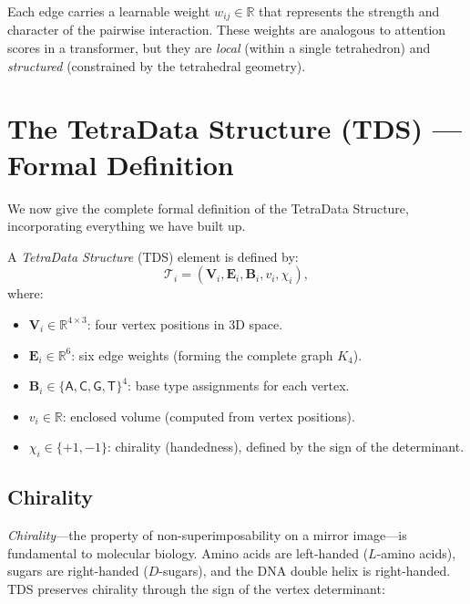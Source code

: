 Each edge carries a learnable weight $w_{ij} \in \mathbb{R}$ that represents
the strength and character of the pairwise interaction. These weights are
analogous to attention scores in a transformer, but they are \emph{local}
(within a single tetrahedron) and \emph{structured} (constrained by the
tetrahedral geometry).

\section{The TetraData Structure (TDS) --- Formal Definition}
\label{sec:tds}

We now give the complete formal definition of the TetraData Structure,
incorporating everything we have built up.

\begin{definition}
\label{def:tds}
A \emph{TetraData Structure} (TDS) element is defined by:
\begin{equation}
\mathcal{T}_i = (\mathbf{V}_i, \mathbf{E}_i, \mathbf{B}_i, v_i, \chi_i),
\end{equation}
where:
\begin{itemize}[leftmargin=1.5em]
  \item $\mathbf{V}_i \in \mathbb{R}^{4 \times 3}$: four vertex positions in 3D space.
  \item $\mathbf{E}_i \in \mathbb{R}^{6}$: six edge weights (forming the complete graph $K_4$).
  \item $\mathbf{B}_i \in \{\mathsf{A}, \mathsf{C}, \mathsf{G}, \mathsf{T}\}^4$: base type assignments for each vertex.
  \item $v_i \in \mathbb{R}$: enclosed volume (computed from vertex positions).
  \item $\chi_i \in \{+1, -1\}$: chirality (handedness), defined by the sign of the determinant.
\end{itemize}
\end{definition}

\subsection{Chirality}
\label{sec:chirality}

\emph{Chirality}---the property of non-superimposability on a mirror image---is
fundamental to molecular biology. Amino acids are left-handed ($L$-amino acids),
sugars are right-handed ($D$-sugars), and the DNA double helix is right-handed.
TDS preserves chirality through the sign of the vertex determinant:

